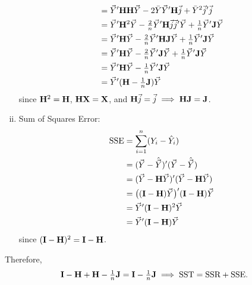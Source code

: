 \begin{Theorem}{}{}
\begin{enumerate}[(i)]
\begin{align*}
                   & =\vec{Y}'\mathbf{HH}\vec{Y}-2\bar{Y}\vec{Y}'\mathbf{H}\vec{j}+\bar{Y}^2 \vec{j}'\vec{j}                                        \\
                   & =\vec{Y}'\mathbf{H}^2 \vec{Y}-\tfrac{2}{n}\vec{Y}'\mathbf{H}\vec{j}\vec{j}'\vec{Y}+\tfrac{1}{n}\vec{Y}'\mathbf{J}\vec{Y} \\
                   & =\vec{Y}'\mathbf{H}\vec{Y}-\tfrac{2}{n}\vec{Y}'\mathbf{H}\mathbf{J}\vec{Y}+\tfrac{1}{n}\vec{Y}'\mathbf{J}\vec{Y}               \\
                   & =\vec{Y}'\mathbf{H}\vec{Y}-\tfrac{2}{n}\vec{Y}'\mathbf{J}\vec{Y}+\tfrac{1}{n}\vec{Y}'\mathbf{J}\vec{Y}                         \\
                   & =\vec{Y}'\mathbf{H}\vec{Y}-\tfrac{1}{n}\vec{Y}'\mathbf{J}\vec{Y}                                                                     \\
                   & =\vec{Y}'(\mathbf{H}-\tfrac{1}{n}\mathbf{J})\vec{Y}
              \end{align*}
              since $ \mathbf{H}^2=\mathbf{H} $, $ \mathbf{HX}=\mathbf{X} $, and $ \mathbf{H}\vec{j}=\vec{j}\implies \mathbf{HJ}=\mathbf{J} $.
        \item Sum of Squares Error:
              \begin{align*}
                  \text{SSE}
                   & =\sum_{i=1}^{n}(Y_i-\hat{Y}_i)                                                   \\
                   & =(\vec{Y}-\hat{\vec{Y}})'(\vec{Y}-\hat{\vec{Y}})                     \\
                   & =(\vec{Y}-\mathbf{H}\vec{Y})'(\vec{Y}-\mathbf{H}\vec{Y})             \\
                   & =\bigl((\mathbf{I}-\mathbf{H})\vec{Y}\bigr)'(\mathbf{I}-\mathbf{H})\vec{Y} \\
                   & =\vec{Y}'(\mathbf{I}-\mathbf{H})^2 \vec{Y}                                 \\
                   & =\vec{Y}'(\mathbf{I}-\mathbf{H})\vec{Y}
              \end{align*}
              since $ (\mathbf{I}-\mathbf{H})^2=\mathbf{I}-\mathbf{H} $.
    \end{enumerate}
    Therefore,
    \[ \mathbf{I}-\mathbf{H}+\mathbf{H}-\tfrac{1}{n}\mathbf{J}=\mathbf{I}-\tfrac{1}{n}\mathbf{J}\implies \text{SST}=\text{SSR}+\text{SSE}. \]
\end{Theorem}
